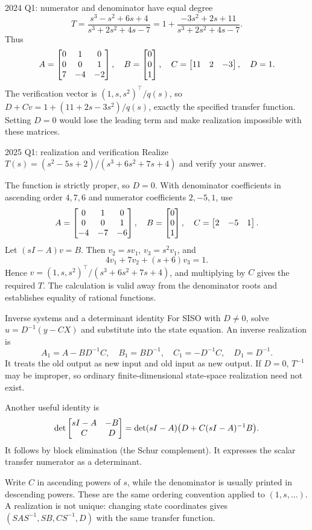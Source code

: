 \begin{worked}{2024 Q1: numerator and denominator have equal degree}
\[T=\frac{s^3-s^2+6s+4}{s^3+2s^2+4s-7}=1+\frac{-3s^2+2s+11}{s^3+2s^2+4s-7}.\]
Thus
\[A=\begin{bmatrix}0&1&0\\0&0&1\\7&-4&-2\end{bmatrix},\quad B=\begin{bmatrix}0\\0\\1\end{bmatrix},\quad C=\begin{bmatrix}11&2&-3\end{bmatrix},\quad D=1.\]
The verification vector is $(1,s,s^2)^{\top}/q(s)$, so $D+Cv=1+(11+2s-3s^2)/q(s)$, exactly the specified transfer function. Setting $D=0$ would lose the leading term and make realization impossible with these matrices.
\end{worked}
\begin{question}{2025 Q1: realization and verification}
Realize $T(s)=(s^2-5s+2)/(s^3+6s^2+7s+4)$ and verify your answer.
\end{question}
\begin{answer}
The function is strictly proper, so $D=0$. With denominator coefficients in ascending order $4,7,6$ and numerator coefficients $2,-5,1$, use
\[A=\begin{bmatrix}0&1&0\\0&0&1\\-4&-7&-6\end{bmatrix},\quad B=\begin{bmatrix}0\\0\\1\end{bmatrix},\quad C=\begin{bmatrix}2&-5&1\end{bmatrix}.\]
Let $(sI-A)v=B$. Then $v_2=sv_1$, $v_3=s^2v_1$, and
\[4v_1+7v_2+(s+6)v_3=1.\]
Hence $v=(1,s,s^2)^{\top}/(s^3+6s^2+7s+4)$, and multiplying by $C$ gives the required $T$. The calculation is valid away from the denominator roots and establishes equality of rational functions.
\end{answer}
\begin{concept}{Inverse systems and a determinant identity}
For SISO with $D\ne0$, solve $u=D^{-1}(y-CX)$ and substitute into the state equation. An inverse realization is
\[A_1=A-BD^{-1}C,\quad B_1=BD^{-1},\quad C_1=-D^{-1}C,\quad D_1=D^{-1}.\]
It treats the old output as new input and old input as new output. If $D=0$, $T^{-1}$ may be improper, so ordinary finite-dimensional state-space realization need not exist.

Another useful identity is
\[\det\begin{bmatrix}sI-A&-B\\C&D\end{bmatrix}=\det(sI-A)\big(D+C(sI-A)^{-1}B\big).\]
It follows by block elimination (the Schur complement). It expresses the scalar transfer numerator as a determinant.
\end{concept}
\begin{tip}
Write $C$ in ascending powers of $s$, while the denominator is usually printed in descending powers. These are the same ordering convention applied to $(1,s,\ldots)$. A realization is not unique: changing state coordinates gives $(SAS^{-1},SB,CS^{-1},D)$ with the same transfer function.
\end{tip}

